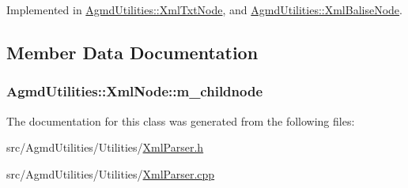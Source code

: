Implemented in \hyperlink{class_agmd_utilities_1_1_xml_txt_node_a30b8af526fdd3c74de577a9bab5c0580}{Agmd\+Utilities\+::\+Xml\+Txt\+Node}, and \hyperlink{class_agmd_utilities_1_1_xml_balise_node_a6e6275c37594b92185f3fec4bcd85f2d}{Agmd\+Utilities\+::\+Xml\+Balise\+Node}.



\subsection{Member Data Documentation}
\hypertarget{class_agmd_utilities_1_1_xml_node_aa71154bbe16cd1d243ff17fa8555eeca}{
\subsubsection[{m\+\_\+childnode}]{ Agmd\+Utilities\+::\+Xml\+Node\+::m\+\_\+childnode\hspace{0.3cm}{\ttfamily [protected]}}}\label{class_agmd_utilities_1_1_xml_node_aa71154bbe16cd1d243ff17fa8555eeca}


The documentation for this class was generated from the following files\+:\begin{DoxyCompactItemize}
\item 
src/\+Agmd\+Utilities/\+Utilities/\hyperlink{_xml_parser_8h}{Xml\+Parser.\+h}\item 
src/\+Agmd\+Utilities/\+Utilities/\hyperlink{_xml_parser_8cpp}{Xml\+Parser.\+cpp}\end{DoxyCompactItemize}
